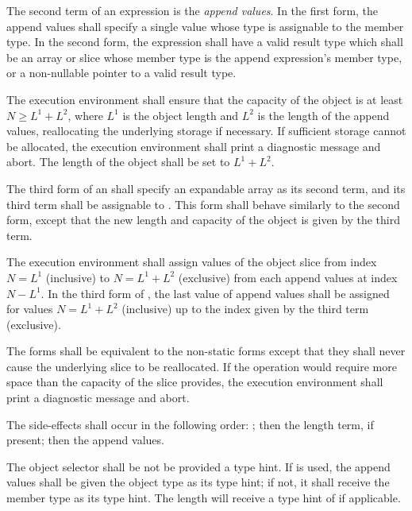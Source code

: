 \specsubsubitem
The second term of an  expression is the \textit{append
values}. In the first form, the append values shall specify a single value
whose type is assignable to the member type. In the second form, the expression
shall have a valid result type which shall be an array or slice whose member
type is the append expression's member type, or a non-nullable pointer to a
valid result type.

\specsubsubitem
The execution environment shall ensure that the capacity of the object is at
least $N \geq L^1 + L^2$, where $L^1$ is the object length and $L^2$ is the
length of the append values, reallocating the underlying storage if necessary.
If sufficient storage cannot be allocated, the execution environment shall
print a diagnostic message and abort. The length of the object shall be set to
$L^1 + L^2$.

\specsubsubitem
The third form of an  shall specify an
expandable array as its second term, and its third term shall be assignable to
. This form shall behave similarly to the second form, except
that the new length and capacity of the object is given by the third term.

\specsubsubitem
The execution environment shall assign values of the object slice from index
$N = L^1$ (inclusive) to $N = L^1 + L^2$ (exclusive) from each append values at
index $N-L^1$. In the third form of , the last
value of append values shall be assigned for values $N = L^1 + L^2$ (inclusive)
up to the index given by the third term (exclusive).

\specsubsubitem
The  forms shall be equivalent to the non-static forms except
that they shall never cause the underlying slice to be reallocated. If the
operation would require more space than the capacity of the slice provides, the
execution environment shall print a diagnostic message and abort.

\specsubsubitem
The side-effects shall occur in the following order:
; then the length term, if present; then the
append values.

\specsubsubitem
The object selector shall be not be provided a type hint. If  is
used, the append values shall be given the object type as its type hint; if
not, it shall receive the member type as its type hint. The length will receive
a type hint of  if applicable.


